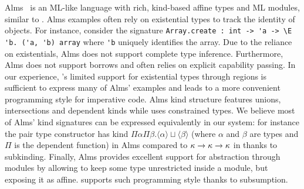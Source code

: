 Alms~\citep{DBLP:conf/popl/TovP11} is an ML-like language with rich, kind-based
affine types and ML modules, similar to \lang.
Alms examples often rely on existential types to track the identity
of objects. For instance, consider the signature
\lstinline/Array.create : int -> 'a -> \E 'b. ('a, 'b) array/ where
\lstinline/'b/ uniquely identifies the array.
Due to the reliance on existentials, Alms does not support complete type inference.
Furthermore, Alms does not support borrows and often relies
on explicit capability passing.
In our experience, \affe's limited support for existential types through
regions is sufficient to express many of Alms' examples and leads to
a more convenient programming style for imperative code.
%
Alms kind structure features unions, intersections and dependent kinds while
\lang uses constrained types.
We believe most of Alms' kind signatures can be expressed equivalently in
our system: for instance the pair type constructor
has kind $\Pi\alpha\Pi\beta. \langle\alpha\rangle \sqcup \langle\beta\rangle$
(where $\alpha$ and $\beta$ are types and $\Pi$ is the dependent function)
in Alms compared to $\kappa\to\kappa\to\kappa$ in \lang thanks
to subkinding.
%
Finally, Alms provides excellent support for abstraction through
modules by allowing to keep some type unrestricted inside a module, but
exposing it as affine. \lang supports
such programming style thanks to subsumption.

